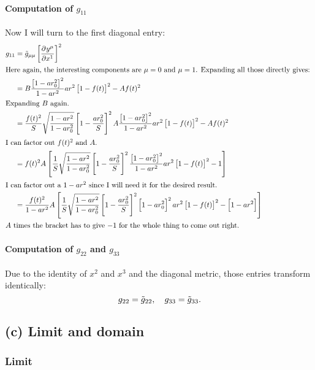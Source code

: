 \paragraph{Computation of $g_{11}$}

Now I will turn to the first diagonal entry:
\begin{align*}
    g_{11}
    &= \tilde g_{\mu\mu} \sbr{\dpd{{y^\mu}}{{x^1}}}^2 \\
    \intertext{%
        Here again, the interesting components are $\mu = 0$ and $\mu = 1$.
        Expanding all those directly gives:
    }
    &= B \frac{\sbr{1 - ar_0^2}^2}{1 - ar^2} ar^2 \sbr{1 - f(t)}^2 - A f(t)^2
    \\
    \intertext{%
        Expanding $B$ again.
    }
    &= \frac{f(t)^2}S \WW \sbr{1 - \frac{ar_0^2}S}^2 A \frac{\sbr{1 -
    ar_0^2}^2}{1 - ar^2} ar^2 \sbr{1 - f(t)}^2 - A f(t)^2 \\
    \intertext{%
        I can factor out $f(t)^2$ and $A$.
    }
    &= f(t)^2 A \sbr{ \frac{1}S \WW \sbr{1 - \frac{ar_0^2}S}^2 \frac{\sbr{1 -
    ar_0^2}^2}{1 - ar^2} ar^2 \sbr{1 - f(t)}^2 - 1} \\
    \intertext{%
        I can factor out a $1 - ar^2$ since I will need it for the desired
        result.
    }
    &= \frac{f(t)^2}{1 - ar^2} A \sbr{ \frac{1}S \WW \sbr{1 - \frac{ar_0^2}S}^2
    \sbr{1 - ar_0^2}^2 ar^2 \sbr{1 - f(t)}^2 - \sbr{1 - ar^2}} \\
    \intertext{%
        $A$ times the bracket has to give $-1$ for the whole thing to come out
        right.
    }
\end{align*}

\paragraph{Computation of $g_{22}$ and $g_{33}$}

Due to the identity of $x^2$ and $x^3$ and the diagonal metric, those entries
transform identically:
\[
    g_{22} = \tilde g_{22}
    ,\quad
    g_{33} = \tilde g_{33}.
\]


\subsection*{(c) Limit and domain}

\subsubsection*{Limit}


